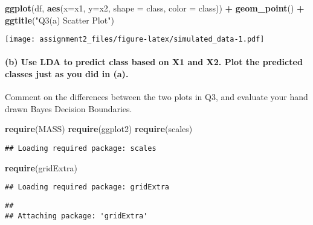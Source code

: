 \documentclass[]{article}
\newenvironment{Shaded}{\begin{snugshade}}{\end{snugshade}}
\newcommand{\DataTypeTok}[1]{\textcolor[rgb]{0.13,0.29,0.53}{#1}}
\newcommand{\KeywordTok}[1]{\textcolor[rgb]{0.13,0.29,0.53}{\textbf{#1}}}
\newcommand{\NormalTok}[1]{#1}
\newcommand{\OperatorTok}[1]{\textcolor[rgb]{0.81,0.36,0.00}{\textbf{#1}}}
\newcommand{\StringTok}[1]{\textcolor[rgb]{0.31,0.60,0.02}{#1}}
\let\oldparagraph\paragraph
\renewcommand{\paragraph}[1]{\oldparagraph{#1}\mbox{}}
\begin{document}
\begin{Shaded}
\begin{Highlighting}[]
\KeywordTok{ggplot}\NormalTok{(df, }\KeywordTok{aes}\NormalTok{(}\DataTypeTok{x=}\NormalTok{x1, }\DataTypeTok{y=}\NormalTok{x2, }\DataTypeTok{shape =}\NormalTok{ class, }\DataTypeTok{color =}\NormalTok{ class)) }\OperatorTok{+}\StringTok{ }\KeywordTok{geom\_point}\NormalTok{() }\OperatorTok{+}\StringTok{ }\KeywordTok{ggtitle}\NormalTok{(}\StringTok{"Q3(a) Scatter Plot"}\NormalTok{)}
\end{Highlighting}
\end{Shaded}

\texttt{[image: assignment2\_files/figure-latex/simulated\_data-1.pdf]}

\hypertarget{b-use-lda-to-predict-class-based-on-x1-and-x2.-plot-the-predicted-classes-just-as-you-did-in-a.}{%
\paragraph{(b) Use LDA to predict class based on X1 and X2. Plot the
predicted classes just as you did in
(a).}\label{b-use-lda-to-predict-class-based-on-x1-and-x2.-plot-the-predicted-classes-just-as-you-did-in-a.}}

Comment on the differences between the two plots in Q3, and evaluate
your hand drawn Bayes Decision Boundaries.

\begin{Shaded}
\begin{Highlighting}[]
\KeywordTok{require}\NormalTok{(MASS)}
\KeywordTok{require}\NormalTok{(ggplot2)}
\KeywordTok{require}\NormalTok{(scales)}
\end{Highlighting}
\end{Shaded}

\begin{verbatim}
## Loading required package: scales
\end{verbatim}

\begin{Shaded}
\begin{Highlighting}[]
\KeywordTok{require}\NormalTok{(gridExtra)}
\end{Highlighting}
\end{Shaded}

\begin{verbatim}
## Loading required package: gridExtra
\end{verbatim}

\begin{verbatim}
## 
## Attaching package: 'gridExtra'
\end{verbatim}
\end{document}
